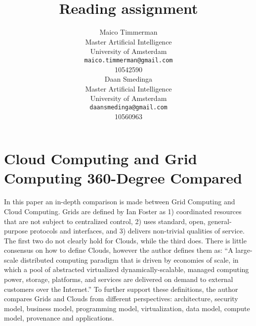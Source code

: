 \documentclass{article}
\title{Reading assignment}
\author{
  Maico Timmerman \\
  Master Artificial Intelligence\\
  University of Amsterdam\\
  \texttt{maico.timmerman@gmail.com} \\
  10542590 \\
  \And
  Daan Smedinga\\
  Master Artificial Intelligence\\
  University of Amsterdam\\
  \texttt{daansmedinga@gmail.com}\\
  10560963
}
\begin{document}

\maketitle


\section*{Cloud Computing and Grid Computing 360-Degree Compared}

In this paper an in-depth comparison is made between Grid Computing and Cloud
Computing. Grids are defined by Ian Foster as 1) coordinated resources that are
not subject to centralized control, 2) uses standard, open, general-purpose
protocols and interfaces, and 3) delivers non-trivial qualities of service. The
first two do not clearly hold for Clouds, while the third does. There is little
consensus on how to define Clouds, however the author defines them as: ``A
large-scale distributed computing paradigm that is driven by economies of scale,
in which a pool of abstracted virtualized dynamically-scalable, managed
computing power, storage, platforms, and services are delivered on demand to
external customers over the Internet.''
To further support these definitions, the author compares Grids and Clouds from
different perspectives: architecture, security model, business model,
programming model, virtualization, data model, compute model, provenance and
applications.
\end{document}
